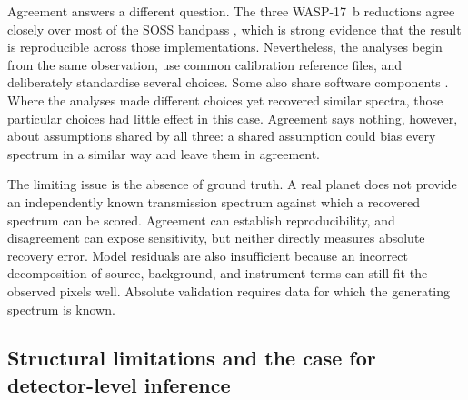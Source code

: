 Agreement answers a different question. The three WASP-17~b reductions agree
closely over most of the SOSS bandpass \citep{LouieEtAl2025}, which is strong
evidence that the result is reproducible across those implementations.
Nevertheless, the analyses begin from the same observation, use common
calibration reference files, and deliberately standardise several choices.
Some also share software components
\citep{BellEtAl2022,RadicaEtAl2023,LouieEtAl2025}. Where the analyses made
different choices yet recovered similar spectra, those particular choices had
little effect in this case. Agreement says nothing, however, about assumptions
shared by all three: a shared assumption could bias every spectrum in a
similar way and leave them in agreement.


The limiting issue is the absence of ground truth. A real planet does not
provide an independently known transmission spectrum against which a recovered
spectrum can be scored. Agreement can establish reproducibility, and
disagreement can expose sensitivity, but neither directly measures absolute
recovery error. Model residuals are also insufficient because an incorrect
decomposition of source, background, and instrument terms can still fit the
observed pixels well. Absolute validation requires data for which the generating
spectrum is known.

\subsection{Structural limitations and the case for detector-level inference}
\label{sec:structural-limitations-inference}
\label{sec:structural-limitations}
\label{sec:benchmark-and-nova}


